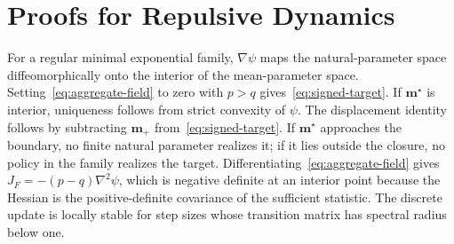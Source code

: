 \section{Proofs for Repulsive Dynamics}
\label{app:proofs}

For a regular minimal exponential family, $\nabla\psi$ maps the natural-parameter space diffeomorphically onto the interior of the mean-parameter space. Setting~\eqref{eq:aggregate-field} to zero with $p>q$ gives~\eqref{eq:signed-target}. If $\mathbf m^\star$ is interior, uniqueness follows from strict convexity of $\psi$. The displacement identity follows by subtracting $\mathbf m_+$ from~\eqref{eq:signed-target}. If $\mathbf m^\star$ approaches the boundary, no finite natural parameter realizes it; if it lies outside the closure, no policy in the family realizes the target. Differentiating~\eqref{eq:aggregate-field} gives $J_F=-(p-q)\nabla^2\psi$, which is negative definite at an interior point because the Hessian is the positive-definite covariance of the sufficient statistic. The discrete update is locally stable for step sizes whose transition matrix has spectral radius below one.

